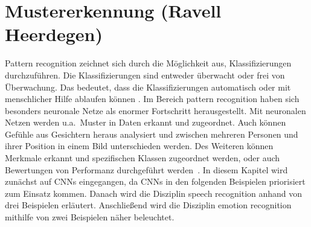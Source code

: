 \section{Mustererkennung (Ravell Heerdegen)} \label{Mustererkennung}
Pattern recognition zeichnet sich durch die Möglichkeit aus, Klassifizierungen durchzuführen. Die Klassifizierungen sind entweder überwacht oder frei von Überwachung. Das bedeutet, dass die Klassifizierungen automatisch oder mit menschlicher Hilfe ablaufen können \cite{svmgmm}. Im Bereich pattern recognition haben sich besonders neuronale Netze als enormer Fortschritt herausgestellt. Mit neuronalen Netzen werden u.a.~Muster in Daten erkannt und zugeordnet. Auch können Gefühle aus Gesichtern heraus analysiert und zwischen mehreren Personen und ihrer Position in einem Bild unterschieden werden. Des Weiteren können Merkmale erkannt und spezifischen Klassen zugeordnet werden, oder auch Bewertungen von Performanz durchgeführt werden~\cite{patternrec}.
In diesem Kapitel wird zunächst auf CNNs eingegangen, da CNNs in den folgenden Beispielen priorisiert zum Einsatz kommen. Danach wird die Disziplin speech recognition anhand von drei Beispielen erläutert. Anschließend wird die Disziplin emotion recognition mithilfe von zwei Beispielen näher beleuchtet.
\\
\\
